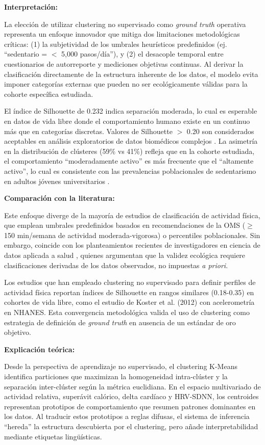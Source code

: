 \textbf{Interpretación:}

La elección de utilizar clustering no supervisado como \textit{ground truth} operativa representa un enfoque innovador que mitiga dos limitaciones metodológicas críticas: (1) la subjetividad de los umbrales heurísticos predefinidos (ej. ``sedentario = $<$ 5,000 pasos/día''), y (2) el desacople temporal entre cuestionarios de autorreporte y mediciones objetivas continuas. Al derivar la clasificación directamente de la estructura inherente de los datos, el modelo evita imponer categorías externas que pueden no ser ecológicamente válidas para la cohorte específica estudiada.

El índice de Silhouette de 0.232 indica separación moderada, lo cual es esperable en datos de vida libre donde el comportamiento humano existe en un continuo más que en categorías discretas. Valores de Silhouette $>$ 0.20 son considerados aceptables en análisis exploratorios de datos biomédicos complejos \cite{Rousseeuw1987Silhouettes}. La asimetría en la distribución de clústeres (59\% vs 41\%) refleja que en la cohorte estudiada, el comportamiento ``moderadamente activo'' es más frecuente que el ``altamente activo'', lo cual es consistente con las prevalencias poblacionales de sedentarismo en adultos jóvenes universitarios \cite{Shamah-Levy2023ENSANUT}.

\textbf{Comparación con la literatura:}

Este enfoque diverge de la mayoría de estudios de clasificación de actividad física, que emplean umbrales predefinidos basados en recomendaciones de la OMS ($\geq$ 150 min/semana de actividad moderada-vigorosa) o percentiles poblacionales. Sin embargo, coincide con los planteamientos recientes de investigadores en ciencia de datos aplicada a salud \cite{Liu2022}, quienes argumentan que la validez ecológica requiere clasificaciones derivadas de los datos observados, no impuestas \textit{a priori}.

Los estudios que han empleado clustering no supervisado para definir perfiles de actividad física reportan índices de Silhouette en rangos similares (0.18-0.35) en cohortes de vida libre, como el estudio de Koster et al. (2012) con acelerometría en NHANES. Esta convergencia metodológica valida el uso de clustering como estrategia de definición de \textit{ground truth} en ausencia de un estándar de oro objetivo.

\textbf{Explicación teórica:}

Desde la perspectiva de aprendizaje no supervisado, el clustering K-Means identifica particiones que maximizan la homogeneidad intra-clúster y la separación inter-clúster según la métrica euclidiana. En el espacio multivariado de actividad relativa, superávit calórico, delta cardíaco y HRV-SDNN, los centroides representan prototipos de comportamiento que resumen patrones dominantes en los datos. Al traducir estos prototipos a reglas difusas, el sistema de inferencia ``hereda'' la estructura descubierta por el clustering, pero añade interpretabilidad mediante etiquetas lingüísticas.

